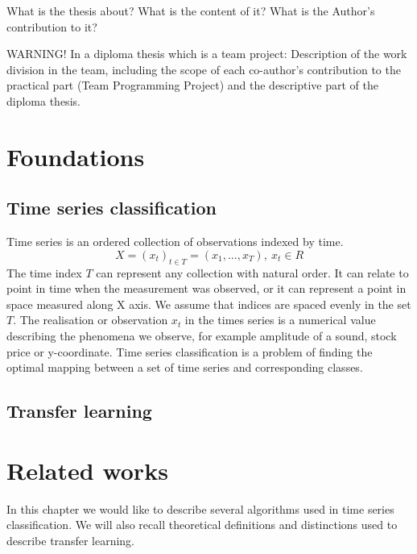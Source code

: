 \documentclass[a4paper,11pt,twoside]{report}
\theoremstyle{definition}
\begin{document}
What is the thesis about? What is the content of it? What is the Author's contribution to it?
\par
WARNING!  In a diploma thesis which is a team project: Description of the work division in the team, including the scope of each co-author’s contribution to the practical part (Team Programming Project) and the descriptive part of the diploma thesis. 
\par


\chapter{Foundations}
\section{Time series classification}
Time series is an ordered collection of observations indexed by time. 
$$X = (x_t)_{t\in T} = (x_1, ... , x_T),\ x_t\in R$$
The time index $T$ can represent any collection with natural order. It can relate to point in time when the measurement was observed, or it can represent a point in space measured along X axis. We assume that indices are spaced evenly in the set $T$. The realisation or observation $x_t$ in the times series is a numerical value describing the phenomena we observe, for example amplitude of a sound, stock price or y-coordinate. Time series classification is a problem of finding the optimal mapping between a set of time series and corresponding classes.

\section{Transfer learning}


\chapter{Related works}
In this chapter we would like to describe several algorithms used in time series classification. We will also recall theoretical definitions and distinctions used to describe transfer learning. 
\end{document}
